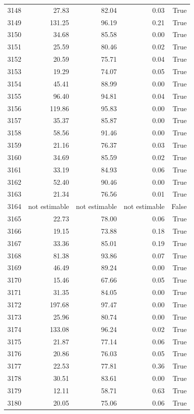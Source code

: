\begin{longtable}{rrrrr}
3148 & 27.83 & 82.04 & 0.03 & True \\
3149 & 131.25 & 96.19 & 0.21 & True \\
3150 & 34.68 & 85.58 & 0.00 & True \\
3151 & 25.59 & 80.46 & 0.02 & True \\
3152 & 20.59 & 75.71 & 0.04 & True \\
3153 & 19.29 & 74.07 & 0.05 & True \\
3154 & 45.41 & 88.99 & 0.00 & True \\
3155 & 96.40 & 94.81 & 0.04 & True \\
3156 & 119.86 & 95.83 & 0.00 & True \\
3157 & 35.37 & 85.87 & 0.00 & True \\
3158 & 58.56 & 91.46 & 0.00 & True \\
3159 & 21.16 & 76.37 & 0.03 & True \\
3160 & 34.69 & 85.59 & 0.02 & True \\
3161 & 33.19 & 84.93 & 0.06 & True \\
3162 & 52.40 & 90.46 & 0.00 & True \\
3163 & 21.34 & 76.56 & 0.01 & True \\
3164 & not estimable & not estimable & not estimable & False \\
3165 & 22.73 & 78.00 & 0.06 & True \\
3166 & 19.15 & 73.88 & 0.18 & True \\
3167 & 33.36 & 85.01 & 0.19 & True \\
3168 & 81.38 & 93.86 & 0.07 & True \\
3169 & 46.49 & 89.24 & 0.00 & True \\
3170 & 15.46 & 67.66 & 0.05 & True \\
3171 & 31.35 & 84.05 & 0.00 & True \\
3172 & 197.68 & 97.47 & 0.00 & True \\
3173 & 25.96 & 80.74 & 0.00 & True \\
3174 & 133.08 & 96.24 & 0.02 & True \\
3175 & 21.87 & 77.14 & 0.06 & True \\
3176 & 20.86 & 76.03 & 0.05 & True \\
3177 & 22.53 & 77.81 & 0.36 & True \\
3178 & 30.51 & 83.61 & 0.00 & True \\
3179 & 12.11 & 58.71 & 0.63 & True \\
3180 & 20.05 & 75.06 & 0.06 & True \\

\end{longtable}

